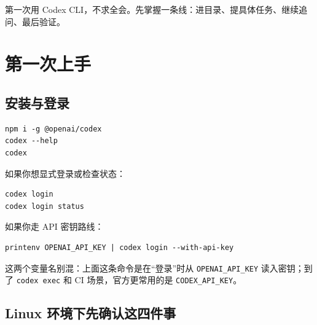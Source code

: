 \documentclass[UTF8,a4paper,11pt]{ctexart}
\begin{document}
\begin{center}
\end{center}

\begin{sumbox}
第一次用 Codex CLI，不求全会。先掌握一条线：进目录、提具体任务、继续追问、最后验证。
\end{sumbox}

\section{第一次上手}

\subsection{安装与登录}

\begin{lstlisting}[style=cli]
npm i -g @openai/codex
codex --help
codex
\end{lstlisting}

如果你想显式登录或检查状态：

\begin{lstlisting}[style=cli]
codex login
codex login status
\end{lstlisting}

如果你走 API 密钥路线：

\begin{lstlisting}[style=cli]
printenv OPENAI_API_KEY | codex login --with-api-key
\end{lstlisting}

\begin{tipbox}
这两个变量名别混：上面这条命令是在“登录”时从 \texttt{OPENAI\_API\_KEY} 读入密钥；到了 \texttt{codex exec} 和 CI 场景，官方更常用的是 \texttt{CODEX\_API\_KEY}。
\end{tipbox}

\subsection{Linux 环境下先确认这四件事}
\end{document}
